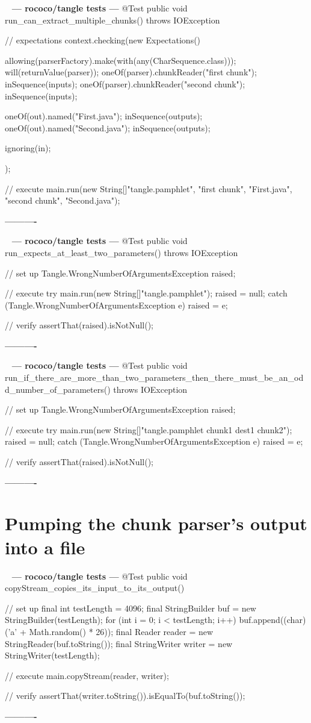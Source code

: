 \documentclass{book}
\newenvironment{chunk}[1]{%
{\ }\newline\noindent%
\hbox{\hskip 2.0cm}{\bf --- #1 ---}%
\verbatim}%                               say exactly what we see
{\endverbatim%
\par{}%
\noindent{}%
\hbox{\hskip 2.0cm}{\bf ----------}%
\par%
\normalsize\noindent}%
\begin{document}
\begin{chunk}{rococo/tangle tests}
@Test
public void run_can_extract_multiple_chunks() throws IOException {
    // expectations
    context.checking(new Expectations() {{
        allowing(parserFactory).make(with(any(CharSequence.class)));
        will(returnValue(parser));
        oneOf(parser).chunkReader("first chunk");
        inSequence(inputs);
        oneOf(parser).chunkReader("second chunk");
        inSequence(inputs);

        oneOf(out).named("First.java");
        inSequence(outputs);
        oneOf(out).named("Second.java");
        inSequence(outputs);

        ignoring(in);
    }});

    // execute
    main.run(new String[]{"tangle.pamphlet", "first chunk", "First.java", "second chunk", "Second.java"});
}
\end{chunk}

\begin{chunk}{rococo/tangle tests}
@Test
public void run_expects_at_least_two_parameters() throws IOException {
    // set up
    Tangle.WrongNumberOfArgumentsException raised;

    // execute
    try {
        main.run(new String[]{"tangle.pamphlet"});
        raised = null;
    } catch (Tangle.WrongNumberOfArgumentsException e) {
        raised = e;
    }

    // verify
    assertThat(raised).isNotNull();
}
\end{chunk}

\begin{chunk}{rococo/tangle tests}
@Test
public void run_if_there_are_more_than_two_parameters_then_there_must_be_an_odd_number_of_parameters() throws IOException {
    // set up
    Tangle.WrongNumberOfArgumentsException raised;

    // execute
    try {
        main.run(new String[]{"tangle.pamphlet chunk1 dest1 chunk2"});
        raised = null;
    } catch (Tangle.WrongNumberOfArgumentsException e) {
        raised = e;
    }

    // verify
    assertThat(raised).isNotNull();
}
\end{chunk}

\section{Pumping the chunk parser’s output into a file}
\begin{chunk}{rococo/tangle tests}
@Test
public void copyStream_copies_its_input_to_its_output() {
    // set up
    final int testLength = 4096;
    final StringBuilder buf = new StringBuilder(testLength);
    for (int i = 0; i < testLength; i++) {
        buf.append((char) ('a' + Math.random() * 26));
    }
    final Reader reader = new StringReader(buf.toString());
    final StringWriter writer = new StringWriter(testLength);

    // execute
    main.copyStream(reader, writer);

    // verify
    assertThat(writer.toString()).isEqualTo(buf.toString());
}
\end{chunk}
\end{document}
